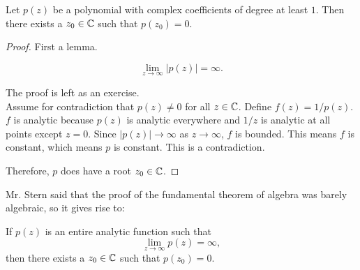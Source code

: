 \documentclass[notes]{subfile}
\begin{document}
\begin{theorem}
    Let $p(z)$ be a polynomial with complex coefficients of degree at least $1$.
    Then there exists a $z_0 \in \operatorname{\mathbb{C}}$ such that $p(z_0) = 0$.
\end{theorem}

\begin{proof}
    First a lemma.
    \begin{lemma}
        \[ \lim_{z \to \infty} |p(z)| = \infty. \]
    \end{lemma}
    
    The proof is left as an exercise. \\

    Assume for contradiction that $p(z) \ne 0$ for all $z \in \operatorname{\mathbb{C}}$.
    Define $f(z) = 1/p(z)$.
    $f$ is analytic because $p(z)$ is analytic everywhere 
    and $1/z$ is analytic at all points except $z = 0$.
    Since $|p(z)| \to \infty$ as $z \to \infty$, 
    $f$ is bounded.
    This means $f$ is constant, which means $p$ is constant.
    This is a contradiction.

    Therefore, $p$ does have a root $z_0 \in \operatorname{\mathbb{C}}$.

\end{proof}
    
Mr. Stern said that the proof of the fundamental theorem of algebra was barely algebraic, so it gives rise to:

\begin{theorem}
    If $p(z)$ is an entire analytic function such that
    \[ \lim_{z \to \infty} p(z) = \infty, \]
    then there exists a $z_0 \in \operatorname{\mathbb{C}}$ such that $p(z_0) = 0$.
\end{theorem}
\end{document}
